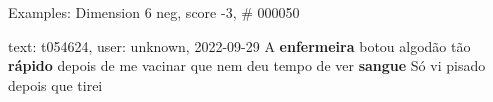 \begin{frame}{Examples: Dimension 6 neg, score -3, \# 000050}
\footnotesize
\begin{alertblock}{text: t054624, user: unknown, 2022-09-29}
A \textbf{enfermeira} botou algodão tão \textbf{rápido} depois de me vacinar 
que nem deu tempo de ver \textbf{sangue} Só vi pisado depois que tirei 
\end{alertblock}
\end{frame}
